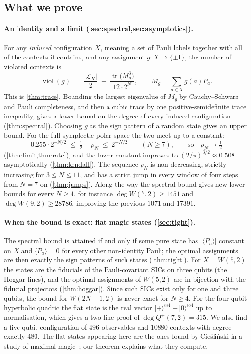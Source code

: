\documentclass[a4paper,onecolumn,11pt,unpublished,nopdfoutputerror]{quantumarticle}
\theoremstyle{definition}
\renewcommand{\deg}{\operatorname{deg}}
\newcommand{\Lines}{\mathcal{L}}
\newcommand{\tr}{\operatorname{tr}}
\newcommand{\viol}{\operatorname{viol}}
\newcommand{\W}[1]{W(#1,2)}
\newcommand{\Qp}[1]{Q^{+}(#1,2)}
\newcommand{\ket}[1]{\lvert #1\rangle}
\newcommand{\ev}[1]{\langle #1\rangle}
\begin{document}
\subsection{What we prove}

\paragraph{An identity and a limit (\cref{sec:spectral,sec:asymptotics}).} For any \emph{induced} configuration
$X$, meaning a set of Pauli labels together with all of the contexts it contains, and any assignment
$g:X\to\{\pm1\}$, the number of violated contexts is
\[
  \viol(g)\;=\;\frac{|\Lines_X|}{2}\;-\;\frac{\tr\bigl(M_g^3\bigr)}{12\cdot2^N},\qquad M_g=\sum_{a\in X}g(a)P_a.
\]
This is \cref{thm:trace}. Bounding the largest eigenvalue of $M_g$ by Cauchy--Schwarz and Pauli completeness, and
then a cubic trace by one positive-semidefinite trace inequality, gives a lower bound on the degree of every
induced configuration (\cref{thm:spectral}). Choosing $g$ as the sign pattern of a random state gives an upper
bound. For the full symplectic polar space the two meet up to a constant:
\[
  0.255\cdot2^{-N/2}\;\le\;\tfrac12-\rho_N\;\le\;2^{-N/2}\qquad(N\ge7),\qquad\text{so}\quad\rho_N\to\tfrac12
\]
(\cref{thm:limit,thm:rate}), and the lower constant improves to $(2/\pi)^{3/2}\approx0.508$ asymptotically
(\cref{thm:kendall}). The sequence $\rho_N$ is non-decreasing, strictly increasing for $3\le N\le11$, and has a
strict jump in every window of four steps from $N=7$ on (\cref{thm:jumps}). Along the way the spectral bound
gives new lower bounds for every $N\ge4$, for instance $\deg\W7\ge1451$ and $\deg\W9\ge28786$, improving the
previous $1071$ and $17391$.

\paragraph{When the bound is exact: flat magic states (\cref{sec:tight}).} The spectral bound is attained if and
only if some pure state has $|\ev{P_a}|$ constant on $X$ and $\ev{P_a}=0$ for every other non-identity Pauli; the
optimal assignments are then exactly the sign patterns of such states (\cref{thm:tight}). For $X=\W5$ the states are
the fiducials of the Pauli-covariant SICs on three qubits (the Hoggar lines), and the optimal assignments of $\W5$
are in bijection with the fiducial projectors (\cref{thm:hoggar}). Since such SICs exist only for one and three
qubits, the bound for $\W{2N-1}$ is never exact for $N\ge4$. For the four-qubit hyperbolic quadric the flat state
is the real vector $\ket{+}^{\otimes4}-\ket{0}^{\otimes4}$ up to normalisation, which gives a two-line proof of
$\deg\Qp7=315$. We also find a five-qubit configuration of $496$ observables and $10880$ contexts with degree exactly
$480$. The flat states appearing here are the ones found by Cie\'sli\'nski in a study of maximal
magic~\cite{Cieslinski2026}; our theorem explains what they compute.
\end{document}
